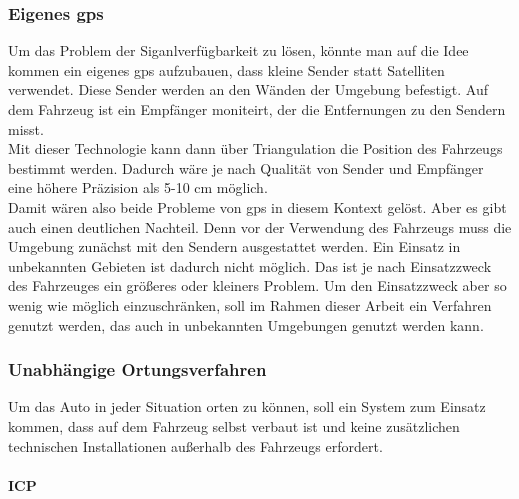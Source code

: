 \subsubsection{Eigenes \ac{gps}}
Um das Problem der Siganlverfügbarkeit zu lösen, könnte man auf die Idee kommen ein eigenes \ac{gps} aufzubauen, dass kleine Sender statt Satelliten verwendet.
Diese Sender werden an den Wänden der Umgebung befestigt. Auf dem Fahrzeug ist ein Empfänger moniteirt, der die Entfernungen zu den Sendern misst.\\
Mit dieser Technologie kann dann über Triangulation die Position des Fahrzeugs bestimmt werden. Dadurch wäre je nach Qualität von Sender und Empfänger eine höhere Präzision als 
5-10 cm möglich. \\
Damit wären also beide Probleme von \ac{gps} in diesem Kontext gelöst. Aber es gibt auch einen deutlichen Nachteil. Denn vor der Verwendung des Fahrzeugs muss die Umgebung zunächst
mit den Sendern ausgestattet werden. Ein Einsatz in unbekannten Gebieten ist dadurch nicht möglich. Das ist je nach Einsatzzweck des Fahrzeuges ein größeres oder kleiners Problem.
Um den Einsatzzweck aber so wenig wie möglich einzuschränken, soll im Rahmen dieser Arbeit ein Verfahren genutzt werden, das auch in unbekannten Umgebungen genutzt werden kann.

\subsubsection{Unabhängige Ortungsverfahren}
Um das Auto in jeder Situation orten zu können, soll ein System zum Einsatz kommen, dass auf dem Fahrzeug selbst verbaut ist und keine zusätzlichen technischen Installationen außerhalb des Fahrzeugs erfordert.\\

\paragraph{ICP}

\newpage
